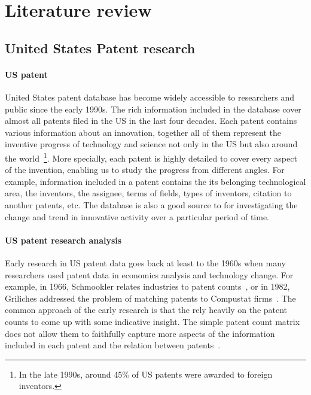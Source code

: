\section{Literature review}

\subsection{United States Patent research}

\paragraph{US patent} United States patent database has become widely accessible to researchers and public since the early 1990s. The rich information included in the database cover almost all patents filed in the US in the last four decades. Each patent contains various information about an innovation, together all of them represent the inventive progress of technology and science not only in the US but also around the world~\footnote{In the late 1990s, around 45\% of US patents were awarded to foreign inventors.}. More specially, each patent is highly detailed to cover every
aspect of the invention, enabling us to study the progress from different angles. For example, information included in a patent contains the its belonging technological area, the inventors, the assignee,  terms of fields, types of inventors, citation to another patents, etc.
The database is also a good source to for investigating the change and trend in innovative activity over a particular period of time. 


\paragraph{US patent research analysis} Early research in US patent data goes
back at least to the 1960s when many researchers used patent data in economics
analysis and technology change. For example, in 1966,  Schmookler relates
industries to patent counts~\cite{Schmookler1966}, or in 1982, Griliches
addressed the problem of matching patents to Compustat
firms~\cite{Griliches1982}. The common approach of the early research is that
the rely heavily on the patent counts to come up with some indicative insight.
The simple patent count matrix does not allow them to faithfully capture more
aspects of the information included in each patent and the relation between
patents~\cite{Griliches1987}.

